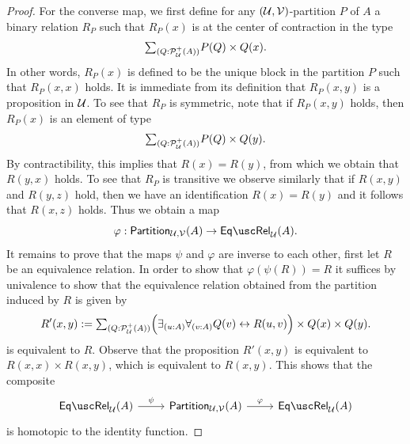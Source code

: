 \begin{proof}
  For the converse map, we first define for any $(\mathcal{U},\mathcal{V})$-partition $P$ of $A$ a binary relation $R_P$ such that $R_P(x)$ is at the center of contraction in the type
  \begin{equation*}
    \sm{Q:\mathcal{P}^+_{\mathcal{U}}(A)}P(Q)\times Q(x).
  \end{equation*}
  In other words, $R_P(x)$ is defined to be the unique block in the partition $P$ such that $R_P(x,x)$ holds. It is immediate from its definition that $R_P(x,y)$ is a proposition in $\mathcal{U}$. To see that $R_P$ is symmetric, note that if $R_P(x,y)$ holds, then $R_P(x)$ is an element of type
  \begin{equation*}
    \sm{Q:\mathcal{P}^+_{\mathcal{U}}(A)}P(Q)\times Q(y).
  \end{equation*}
  By contractibility, this implies that $R(x)=R(y)$, from which we obtain that $R(y,x)$ holds. To see that $R_P$ is transitive we observe similarly that if $R(x,y)$ and $R(y,z)$ hold, then we have an identification $R(x)=R(y)$ and it follows that $R(x,z)$ holds.  Thus we obtain a map
  \begin{equation*}
    \varphi:\partition_{\UU,\VV}(A)\to\eqrel_{\UU}(A).
  \end{equation*}
  It remains to prove that the maps $\psi$ and $\varphi$ are inverse to each other, first let $R$ be an equivalence relation. In order to show that $\varphi(\psi(R))=R$ it suffices by univalence to show that the equivalence relation obtained from the partition induced by $R$ is given by
  \begin{equation*}
    R'(x,y):=\sm{Q:\mathcal{P}_{\UU}^+(A)}\Big(\exists_{(u:A)}\forall_{(v:A)}Q(v)\leftrightarrow R(u,v)\Big)\times Q(x)\times Q(y).
  \end{equation*}
  is equivalent to $R$. Observe that the proposition $R'(x,y)$ is equivalent to $R(x,x)\times R(x,y)$, which is equivalent to $R(x,y)$. This shows that the composite
  \begin{equation*}
    \begin{tikzcd}
      \eqrel_{\UU}(A) \arrow[r,"\psi"] & \partition_{\UU,\VV}(A) \arrow[r,"\varphi"] & \eqrel_{\UU}(A)
    \end{tikzcd}
  \end{equation*}
  is homotopic to the identity function.


\end{proof}
